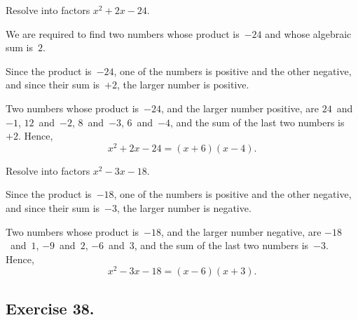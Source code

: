 \documentclass[12pt]{book}[2005/09/16]
\newcommand{\Require}[1][2\baselineskip]{%
  \setlength{\TmpLen}{\pagegoal-\pagetotal}%
  \ifthenelse{\lengthtest{0pt < \TmpLen}\and\lengthtest{\TmpLen < #1}}{%
    \vfil\newpage%
  }{}%
}
\newcommand{\Exercise}[2][]{%
  \Require[3\baselineskip]
  \subsection*{\centering\small Exercise #2}
  \ifthenelse{\not\equal{#1}{}}{%
    \subsubsection*{\centering\normalfont\small\scshape #1}
  }{}
  \phantomsection\label{exer:#2}%
}
\newenvironment{Soln}[1][]{\par\small\textsc{#1}}{\par}
\newcommand{\Item}[1]{\vspace{4pt plus 16pt}\makebox[1em][r]{\textbf{#1}\ }}
\newlength{\TmpLen}
\begin{document}
\Item{3.}  Resolve into factors $x^{2} + 2x - 24$.
\begin{Soln}
We are required to find two numbers whose product is~$-24$ and
whose algebraic sum is~$2$.

Since the product is~$-24$, one of the numbers is positive and the
other negative, and since their sum is~$+2$, the larger number is
positive.

Two numbers whose product is~$-24$, and the larger number positive,
are $24$~and~$-1$, $12$~and~$-2$, $8$~and~$-3$, $6$~and~$-4$, and the sum
of the last two numbers is~$+2$.  Hence,
\[
x^{2} + 2x - 24 = (x + 6)(x - 4).
\]
\end{Soln}

\Item{4.}  Resolve into factors $x^{2} - 3x - 18$.
\begin{Soln}
Since the product is~$-18$, one of the numbers is positive and the
other negative, and since their sum is~$-3$, the larger number is
negative.

Two numbers whose product is~$-18$, and the larger number negative,
are $-18$~and~$1$, $-9$~and~$2$, $-6$~and~$3$, and the sum of the last
two numbers is~$-3$.  Hence,
\[
x^{2} - 3x - 18 = (x - 6)(x + 3).
\]
\end{Soln}

\Exercise{38.}
\end{document}
